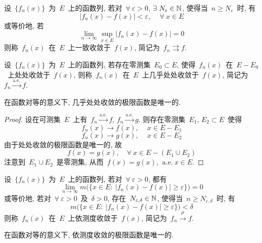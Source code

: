 \begin{definition}
设~$\{f_n(x)\}$~为~$E$~上的函数列, 若对~$\forall~\varepsilon > 0$,
$\exists~N_\varepsilon \in \mathbb{N}$, 使得当~$n \geqslant N_\varepsilon$~时, 有
\[
|f_n(x) - f(x)| < \varepsilon, \,\quad \forall~ x \in E
\]
或等价地, 若
\[
\lim_{n \to \infty} \sup_{x \in E} |f_n(x) - f(x)| = 0
\]
则称~$f_n(x)$~在~$E$~上一致收敛于~$f(x)$, 简记为~$f_n \rightrightarrows f$.
\end{definition}

\begin{definition}
设~$\{f_n(x)\}$~为~$E$~上的函数列, 若存在零测集~$E_0 \subset E$, 使得~$f_n(x)$~在~$E - E_0$~上处处收敛于~$f(x)$, 则称~$f_n(x)$~在~$E$~上几乎处处收敛于~$f(x)$, 简记为~$f_n \xrightarrow{\mathrm{a.e.}} f$.
\end{definition}

\begin{remark}
在函数对等的意义下, 几乎处处收敛的极限函数是唯一的.
\end{remark}

\begin{proof}
设在可测集~$E$~上有~$f_n \xrightarrow{\mathrm{a.e.}} f,\, f_n \xrightarrow{\mathrm{a.e.}} g$. 则存在零测集~$E_1, \, E_2 \subset E$~使得
\[
f_n(x) \rightarrow f(x), \, \quad x \in E - E_1
\]
\[
f_n(x) \rightarrow g(x), \, \quad x \in E - E_2
\]
由于处处收敛的极限函数是唯一的, 故
\[
f(x) = g(x), \quad \forall~x \in E - (E_1 \cup E_2)
\]
注意到~$E_1 \cup E_2$~是零测集, 从而~$f(x) = g(x), \, \mathrm{~a.e.~} x \in E$.
\end{proof}

\begin{definition}
设~$\{f_n(x)\}$~为~$E$~上的函数列, 若对~$\forall~\varepsilon > 0$, 都有
\[
\lim_{n \to \infty} m\big( \{x \in E: \: |f_n(x) - f(x)| \geqslant \varepsilon\} \big) = 0
\]
或等价地,
若对~$\forall~\varepsilon > 0$~及~$\delta > 0$, 存在~$N_{\varepsilon,\delta} \in \mathbb{N}$, 使得当~$n \geqslant N_{\varepsilon,\delta}$~时, 有
\[
m\big( \{x \in E: \: |f_n(x) - f(x)| \geqslant \varepsilon\} \big) < \delta
\]
则称~$f_n(x)$~在~$E$~上依测度收敛于~$f(x)$, 简记为~$f_n \xrightarrow{~\mu~} f$.
\end{definition}

\begin{remark}
在函数对等的意义下, 依测度收敛的极限函数是唯一的.
\end{remark}

